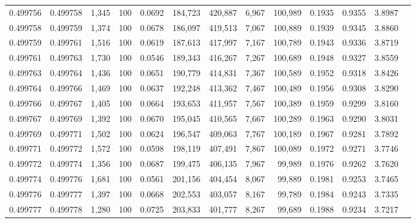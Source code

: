 \begin{tabular}{rrrrrrrrrrrrr}
0.499756 & 0.499758 & 1,345 & 100 &                                     0.0692 & 184,723 & 420,887 &   6,967 & 100,989 & 0.1935 & 0.9355 & 3.8987 \\
0.499758 & 0.499759 & 1,374 & 100 &                                     0.0678 & 186,097 & 419,513 &   7,067 & 100,889 & 0.1939 & 0.9345 & 3.8860 \\
0.499759 & 0.499761 & 1,516 & 100 &                                     0.0619 & 187,613 & 417,997 &   7,167 & 100,789 & 0.1943 & 0.9336 & 3.8719 \\
0.499761 & 0.499763 & 1,730 & 100 &                                     0.0546 & 189,343 & 416,267 &   7,267 & 100,689 & 0.1948 & 0.9327 & 3.8559 \\
0.499763 & 0.499764 & 1,436 & 100 &                                     0.0651 & 190,779 & 414,831 &   7,367 & 100,589 & 0.1952 & 0.9318 & 3.8426 \\
0.499764 & 0.499766 & 1,469 & 100 &                                     0.0637 & 192,248 & 413,362 &   7,467 & 100,489 & 0.1956 & 0.9308 & 3.8290 \\
0.499766 & 0.499767 & 1,405 & 100 &                                     0.0664 & 193,653 & 411,957 &   7,567 & 100,389 & 0.1959 & 0.9299 & 3.8160 \\
0.499767 & 0.499769 & 1,392 & 100 &                                     0.0670 & 195,045 & 410,565 &   7,667 & 100,289 & 0.1963 & 0.9290 & 3.8031 \\
0.499769 & 0.499771 & 1,502 & 100 &                                     0.0624 & 196,547 & 409,063 &   7,767 & 100,189 & 0.1967 & 0.9281 & 3.7892 \\
0.499771 & 0.499772 & 1,572 & 100 &                                     0.0598 & 198,119 & 407,491 &   7,867 & 100,089 & 0.1972 & 0.9271 & 3.7746 \\
0.499772 & 0.499774 & 1,356 & 100 &                                     0.0687 & 199,475 & 406,135 &   7,967 &  99,989 & 0.1976 & 0.9262 & 3.7620 \\
0.499774 & 0.499776 & 1,681 & 100 &                                     0.0561 & 201,156 & 404,454 &   8,067 &  99,889 & 0.1981 & 0.9253 & 3.7465 \\
0.499776 & 0.499777 & 1,397 & 100 &                                     0.0668 & 202,553 & 403,057 &   8,167 &  99,789 & 0.1984 & 0.9243 & 3.7335 \\
0.499777 & 0.499778 & 1,280 & 100 &                                     0.0725 & 203,833 & 401,777 &   8,267 &  99,689 & 0.1988 & 0.9234 & 3.7217 \\

\end{tabular}
